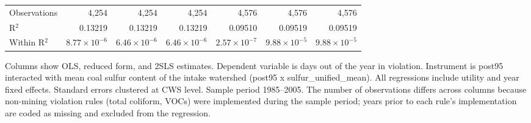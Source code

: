 \begin{table}[htbp]
\begin{adjustbox}{width = \textwidth, center}
\begin{tabular}{lrrrrrr}
         Observations                                                        & 4,254                 & 4,254                 & 4,254                 & 4,576                 & 4,576                 & 4,576\\  
         R$^2$                                                               & 0.13219               & 0.13219               & 0.13219               & 0.09510               & 0.09519               & 0.09519\\  
         Within R$^2$                                                        & $8.77\times 10^{-6}$  & $6.46\times 10^{-6}$  & $6.46\times 10^{-6}$  & $2.57\times 10^{-7}$  & $9.88\times 10^{-5}$  & $9.88\times 10^{-5}$\\   
         
         \bottomrule
         
      \end{tabular}
      
      
      
   \end{adjustbox}
      {\tiny\linespread{1}\selectfont \par \raggedright 
   Columns show OLS, reduced form, and 2SLS estimates. Dependent variable is days out of the year in violation. Instrument is post95 interacted with mean coal sulfur content of the intake watershed (post95 x sulfur\_unified\_mean). All regressions include utility and year fixed effects. Standard errors clustered at CWS level. Sample period 1985--2005. The number of observations differs across columns because non-mining violation rules (total coliform, VOCs) were implemented during the sample period; years prior to each rule's implementation are coded as missing and excluded from the regression.}
   
\end{table}


